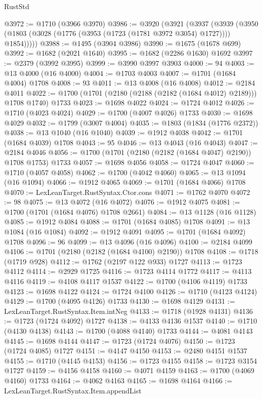 \begin{lexlean}{RustStd}
\begin{coremodule}
@3972 := @1710 (@3966 @3970)
@3986 := @3920
    (@3921
      (@3937
        (@3939 (@3950 (@1803 (@3028 (@1776 (@3953 (@1723 (@1781 @3972 @3054) @1727)))) @1854)))))
@3988 := @1495 (@3904 @3986)
@3990 := @1675 (@1678 @699)
@3992 := @1682 (@2021 @1640)
@3995 := @1682 (@2286 @1630) @1692
@3997 := @2379 (@3992 @3995)
@3999 := @3990 @3997 @3903
@4000 := 94
@4003 := @13 @4000 (@16 @4000)
@4004 := @1703 @4003
@4007 := @1701 (@1684 @4004) @1708
@4008 := 93
@4011 := @13 @4008 (@16 @4008)
@4012 := @2184 @4011
@4022 := @1700 (@1701 (@2180 (@2188 (@2182 (@1684 @4012) @2189))) @1708 @1740) @1733
@4023 := @1698 @4022
@4024 := @1724 @4012
@4026 := @1710 (@4023 @4024)
@4029 := @1700 (@4007 @4026) @1733
@4030 := @1698 @4029
@4032 := @1799 (@3007 @4004)
@4035 := @1803 (@1834 (@1776 @2372))
@4038 := @13 @1040 (@16 @1040)
@4039 := @1912 @4038
@4042 := @1701 (@1684 @4039) @1708
@4043 := 95
@4046 := @13 @4043 (@16 @4043)
@4047 := @2184 @4046
@4056 := @1700 (@1701 (@2180 (@2182 (@1684 @4047) @2190)) @1708 @1753) @1733
@4057 := @1698 @4056
@4058 := @1724 @4047
@4060 := @1710 (@4057 @4058)
@4062 := @1700 (@4042 @4060)
@4065 := @13 @1094 (@16 @1094)
@4066 := @1912 @4065
@4069 := @1701 (@1684 @4066) @1708
@4070 := LexLeanTarget.RustSyntax.Ctor.cons
@4071 := @1762 @4070
@4072 := 98
@4075 := @13 @4072 (@16 @4072)
@4076 := @1912 @4075
@4081 := @1700 (@1701 (@1684 @4076) @1708 @2661)
@4084 := @13 @1128 (@16 @1128)
@4085 := @1912 @4084
@4088 := @1701 (@1684 @4085) @1708
@4091 := @13 @1084 (@16 @1084)
@4092 := @1912 @4091
@4095 := @1701 (@1684 @4092) @1708
@4096 := 96
@4099 := @13 @4096 (@16 @4096)
@4100 := @2184 @4099
@4106 := @1701 (@2180 (@2182 (@1684 @4100) @2190)) @1708
@4108 := @1718 (@1719 @928)
@4112 := @1762 (@2197 @122 @933) @1727
@4113 := @1723 @4112
@4114 := @2929 @1725
@4116 := @1723 @4114 @1772
@4117 := @4113 @4116
@4119 := @4108 @4117 @1537
@4122 := @1700 (@4106 @4119) @1733
@4123 := @1698 @4122
@4124 := @1724 @4100
@4126 := @1710 (@4123 @4124)
@4129 := @1700 (@4095 @4126) @1733
@4130 := @1698 @4129
@4131 := LexLeanTarget.RustSyntax.Item.intNeg
@4133 := @1718 (@1928 @4131)
@4136 := @1723 (@1724 @4092) @1727
@4138 := @4133 @4136 @1537
@4140 := @1710 (@4130 @4138)
@4143 := @1700 (@4088 @4140) @1733
@4144 := @4081 @4143
@4145 := @1698 @4144
@4147 := @1723 (@1724 @4076)
@4150 := @1723 (@1724 @4085) @1727
@4151 := @4147 @4150
@4153 := @2480 @4151 @1537
@4155 := @1710 (@4145 @4153)
@4156 := @1723 @4155
@4158 := @1723 @3154 @1727
@4159 := @4156 @4158
@4160 := @4071 @4159
@4163 := @1700 (@4069 @4160) @1733
@4164 := @4062 @4163
@4165 := @1698 @4164
@4166 := LexLeanTarget.RustSyntax.Item.appendList

\end{coremodule}
\end{lexlean}
